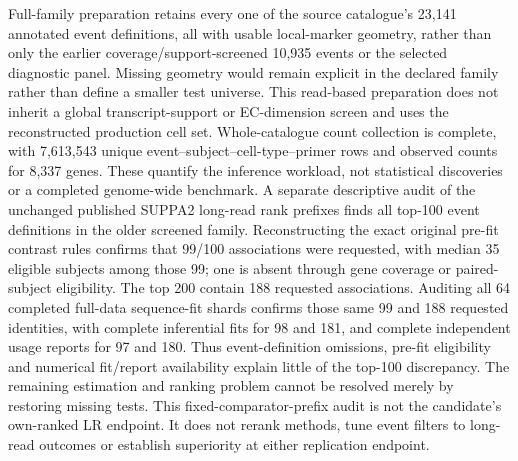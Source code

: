 \documentclass[11pt]{article}
\begin{document}
Full-family preparation retains every one of the source catalogue's 23,141 annotated event definitions, all with usable local-marker geometry, rather than only the earlier coverage/support-screened 10,935 events or the selected diagnostic panel. Missing geometry would remain explicit in the declared family rather than define a smaller test universe. This read-based preparation does not inherit a global transcript-support or EC-dimension screen and uses the reconstructed production cell set. Whole-catalogue count collection is complete, with 7,613,543 unique event--subject--cell-type--primer rows and observed counts for 8,337 genes. These quantify the inference workload, not statistical discoveries or a completed genome-wide benchmark. A separate descriptive audit of the unchanged published SUPPA2 long-read rank prefixes finds all top-100 event definitions in the older screened family. Reconstructing the exact original pre-fit contrast rules confirms that 99/100 associations were requested, with median 35 eligible subjects among those 99; one is absent through gene coverage or paired-subject eligibility. The top 200 contain 188 requested associations. Auditing all 64 completed full-data sequence-fit shards confirms those same 99 and 188 requested identities, with complete inferential fits for 98 and 181, and complete independent usage reports for 97 and 180. Thus event-definition omissions, pre-fit eligibility and numerical fit/report availability explain little of the top-100 discrepancy. The remaining estimation and ranking problem cannot be resolved merely by restoring missing tests. This fixed-comparator-prefix audit is not the candidate's own-ranked LR endpoint. It does not rerank methods, tune event filters to long-read outcomes or establish superiority at either replication endpoint.
\end{document}
